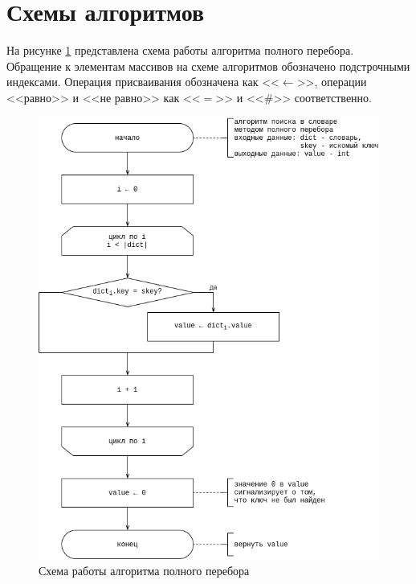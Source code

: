 \section{Схемы алгоритмов}\label{sec:design-flowcharts}
На рисунке \ref{fig:brute} представлена схема работы алгоритма полного перебора. Обращение к элементам массивов на схеме алгоритмов обозначено подстрочными индексами.
Операция присваивания обозначена как <<$\leftarrow$>>, операции <<равно>> и <<не равно>> как <<$=$>> и <<$\#$>> соответственно.
\begin{center}
	\begin{figure}[H]
		\centering
		\includegraphics[width=0.83\linewidth]{assets/dict-brute.drawio.png}
		\caption{Схема работы алгоритма полного перебора}
		\label{fig:brute}
	\end{figure}
\end{center}

